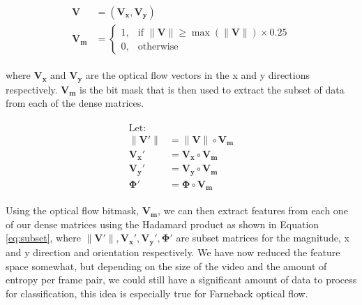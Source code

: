 \begin{align}
  \begin{split}
  \mathbf{V} &= (\mathbf{V_x}, \mathbf{V_y}) \\
  \mathbf{V_m} &=
  \begin{cases}
    1, & \text{if } \|\mathbf{V}\| \geq \max( \|\mathbf{V}\|) \times 0.25 \\
    0, & \text{otherwise}
  \end{cases}
  \end{split}
  \label{eq:optical_threshold}
\end{align}

where $\mathbf{V_x}$ and $\mathbf{V_y}$ are the optical flow vectors in the
x and y directions respectively. $\mathbf{V_m}$ is the bit mask that is
then used to extract the subset of data from each of the dense matrices.

\begin{align}
  \begin{split}
  \text{Let: } \\
  \|\mathbf{V\prime}\| &= \|\mathbf{V}\| \circ \mathbf{V_m}\\
  \mathbf{V_x\prime} &= \mathbf{V_x} \circ \mathbf{V_m}\\
  \mathbf{V_y\prime} &= \mathbf{V_y} \circ \mathbf{V_m}\\
  \mathbf{\Phi\prime} &= \mathbf{\Phi} \circ \mathbf{V_m}
\end{split}
\label{eq:subset}
\end{align}

Using the optical flow bitmask, $\mathbf{V_m}$, we can then extract features
from each one of our dense matrices using the Hadamard product as shown in
Equation \ref{eq:subset}, where $\|\mathbf{V\prime}\|,
\mathbf{V_x\prime},\mathbf{V_y\prime}, \mathbf{\Phi\prime}$ are subset matrices
for the magnitude, x and y direction and orientation respectively. We have now
reduced the feature space somewhat, but depending on the size of the video and the
amount of entropy per frame pair, we could still have a significant amount of
data to process for classification, this idea is especially true for
Farneback optical flow.

